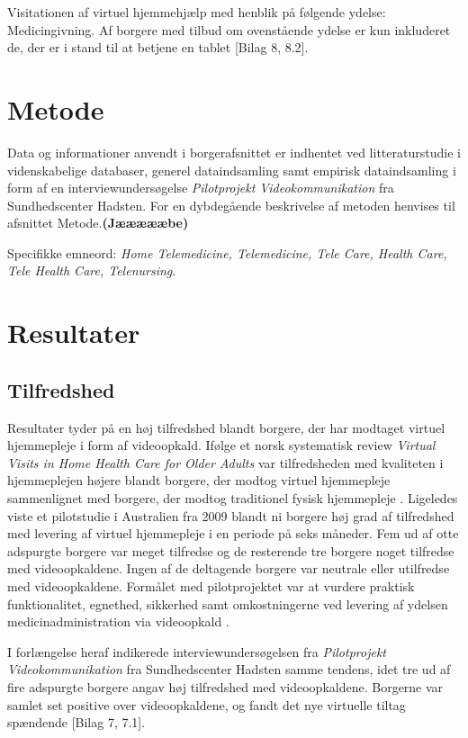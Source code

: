 Visitationen af virtuel hjemmehjælp med henblik på følgende ydelse: Medicingivning. Af borgere med tilbud om ovenstående ydelse er kun inkluderet de, der er i stand til at betjene en tablet [Bilag 8, 8.2].

\section{Metode}
Data og informationer anvendt i borgerafsnittet er indhentet ved litteraturstudie i videnskabelige databaser, generel dataindsamling samt empirisk dataindsamling i form af en interviewundersøgelse \textit{Pilotprojekt Videokommunikation} fra Sundhedscenter Hadsten. For en dybdegående beskrivelse af metoden henvises til afsnittet Metode.\textbf{(Jæææææbe)}

Specifikke emneord: \textit{Home Telemedicine, Telemedicine, Tele Care, Health Care, Tele Health Care, Telenursing}.

\section{Resultater}

\subsection{Tilfredshed}
Resultater tyder på en høj tilfredshed blandt borgere, der har modtaget virtuel hjemmepleje i form af videoopkald. Ifølge et norsk systematisk review \textit{Virtual Visits in Home Health Care for Older Adults} var tilfredsheden med kvaliteten i hjemmeplejen højere blandt borgere, der modtog virtuel hjemmepleje sammenlignet med borgere, der modtog traditionel fysisk hjemmepleje \cite{Baf2}. Ligeledes viste et pilotstudie i Australien fra 2009 blandt ni borgere høj grad af tilfredshed med levering af virtuel hjemmepleje i en periode på seks måneder. Fem ud af otte adspurgte borgere var meget tilfredse og de resterende tre borgere noget tilfredse med videoopkaldene. Ingen af de deltagende borgere var neutrale eller utilfredse med videoopkaldene. Formålet med pilotprojektet var at vurdere praktisk funktionalitet, egnethed, sikkerhed samt omkostningerne ved levering af ydelsen medicinadministration via videoopkald \cite{wade}. 

I forlængelse heraf indikerede interviewundersøgelsen fra \textit{Pilotprojekt Videokommunikation} fra Sundhedscenter Hadsten samme tendens, idet tre ud af fire adspurgte borgere angav høj tilfredshed med videoopkaldene. Borgerne var samlet set positive over videoopkaldene, og fandt det nye virtuelle tiltag spændende [Bilag 7, 7.1]. 

